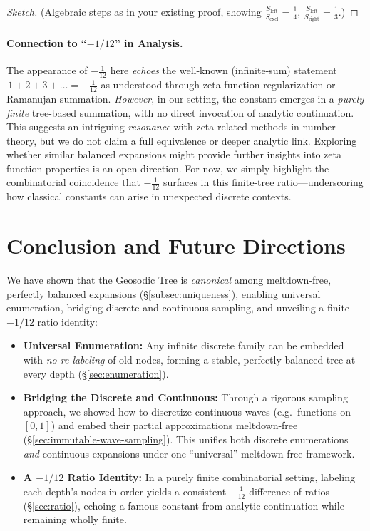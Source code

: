 \documentclass[acmsmall]{acmart}
\theoremstyle{definition}
\theoremstyle{remark}
\begin{document}
\begin{proof}[Sketch]
(Algebraic steps as in your existing proof, showing 
\(\tfrac{S_{\text{left}}}{S_{\text{excl}}} = \frac{1}{4}\),
\(\tfrac{S_{\text{left}}}{S_{\text{right}}} = \frac{1}{3}\).)
\end{proof}

\paragraph{Connection to ``\texorpdfstring{$-1/12$}{-1/12}'' in Analysis.}
The appearance of $-\tfrac{1}{12}$ here \emph{echoes} the well-known 
(infinite-sum) statement $\,1 + 2 + 3 + \dots = -\tfrac{1}{12}$ 
as understood through zeta function regularization or Ramanujan summation. 
\emph{However}, in our setting, the constant emerges in a \emph{purely finite} 
tree-based summation, with no direct invocation of analytic continuation. 
This suggests an intriguing \emph{resonance} with zeta-related methods 
in number theory, but we do not claim a full equivalence or deeper analytic link. 
Exploring whether similar balanced expansions might provide further insights 
into zeta function properties is an open direction. For now, we simply highlight 
the combinatorial coincidence that $-\tfrac{1}{12}$ surfaces in this 
finite-tree ratio---underscoring how classical constants can arise 
in unexpected discrete contexts.
 \section{Conclusion and Future Directions}
\label{sec:conclusion}

We have shown that the Geosodic Tree is \emph{canonical} among meltdown-free,
perfectly balanced expansions (\S\ref{subsec:uniqueness}), enabling universal
enumeration, bridging discrete and continuous sampling, and unveiling a finite
$-1/12$ ratio identity:

\begin{itemize}
  \item \textbf{Universal Enumeration:}
    Any infinite discrete family can be embedded with \emph{no re-labeling} of old nodes,
    forming a stable, perfectly balanced tree at every depth (\S\ref{sec:enumeration}).

  \item \textbf{Bridging the Discrete and Continuous:}
    Through a rigorous sampling approach, we showed how to discretize continuous waves
    (e.g.\ functions on $[0,1]$) and embed their partial approximations meltdown-free
    (\S\ref{sec:immutable-wave-sampling}). This unifies both discrete enumerations
    \emph{and} continuous expansions under one “universal” meltdown-free framework.

  \item \textbf{A $-1/12$ Ratio Identity:}
    In a purely finite combinatorial setting, labeling each depth’s nodes
    in-order yields a consistent $-\tfrac{1}{12}$ difference of ratios
    (\S\ref{sec:ratio}), echoing a famous constant from analytic continuation
    while remaining wholly finite.
\end{itemize}
\end{document}
